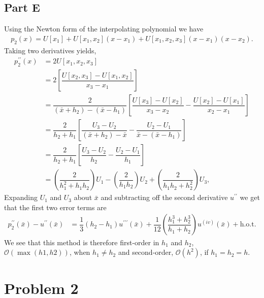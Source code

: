 \documentclass[12pt]{article}
\newcommand{\xbar}{\bar{x}}
\newcommand{\bO}{\mathcal{O}}
\begin{document}
\subsection*{Part E}
Using the Newton form of the interpolating polynomial we have
\begin{align}
    p_{2}(x) = U[x_{1}] + U[x_{1}, x_{2}](x-x_{1}) + U[x_{1},x_{2},x_{3}](x-x_{1})(x-x_{2}).
\end{align}
Taking two derivatives yields,
\begin{subequations}
    \begin{align}
        p_{2}^{\prime\prime}(x) &= 2U[x_{1},x_{2},x_{3}]\\
        &= 2\left[\dfrac{U[x_{2},x_{3}]-U[x_{1},x_{2}]}{x_{3}-x_{1}}\right]\\
        &= \dfrac{2}{(\xbar + h_{2})-(\xbar-h_{1})}\left[\dfrac{U[x_{3}]-U[x_{2}]}{x_{3}-x_{2}}
        - \dfrac{U[x_{2}]-U[x_{1}]}{x_{2}-x_{1}}\right]\\
        &= \dfrac{2}{h_{2}+h_{1}}\left[\dfrac{U_{3}-U_{2}}{(\xbar+h_{2})-\xbar}
        - \dfrac{U_{2}-U_{1}}{\xbar-(\xbar-h_{1})}\right]\\
        &= \dfrac{2}{h_{2}+h_{1}}\left[\dfrac{U_{3}-U_{2}}{h_{2}}-\dfrac{U_{2}-U_{1}}{h_{1}}\right]\\
        &= \left( \dfrac{2}{h_{1}^{2}+h_{1}h_{2}}\right)U_{1} - \left(\dfrac{2}{h_{1}h_{2}}\right)U_{2}
        + \left(\dfrac{2}{h_{1}h_{2}+h_{2}^{2}}\right)U_{3},
    \end{align}
\end{subequations}
Expanding $U_{1}$ and $U_{3}$ about $\xbar$ and subtracting off the second derivative $u^{\prime\prime}$ we get that the first two
error terms are
\begin{align}
    p_{2}^{\prime\prime}(\xbar) - u^{\prime\prime}(\xbar) &= \dfrac{1}{3}(h_{2}-h_{1})u^{\prime\prime\prime}(\xbar)
    + \dfrac{1}{12}\left(\dfrac{h_{1}^{3}+h_{2}^{3}}{h_{1}+h_{2}}\right)u^{(iv)}(\xbar) + \mathrm{h.o.t}.
\end{align}
We see that this method is therefore first-order in $h_{1}$ and $h_{2}$, $\bO(\max(h1,h2))$, when $h_{1}\neq h_{2}$ and second-order,
$\bO(h^{2})$, if $h_{1} = h_{2} = h$.

\section*{Problem 2}
\end{document}
